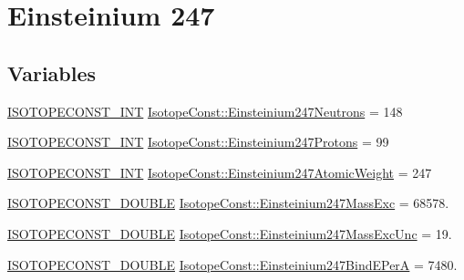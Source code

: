 \hypertarget{group___isotope_const-_einsteinium-_es247}{}\section{Einsteinium 247}
\label{group___isotope_const-_einsteinium-_es247}
\subsection*{Variables}
\begin{DoxyCompactItemize}
\item 
\mbox{\hyperlink{group___isotope_const-_macros_ga5f18360b3e99483a35c32d789e62621c}{I\+S\+O\+T\+O\+P\+E\+C\+O\+N\+S\+T\+\_\+\+I\+NT}} \mbox{\hyperlink{group___isotope_const-_einsteinium-_es247_gae4c076cff4a05f58e2dd157de63b1347}{Isotope\+Const\+::\+Einsteinium247\+Neutrons}} = 148
\item 
\mbox{\hyperlink{group___isotope_const-_macros_ga5f18360b3e99483a35c32d789e62621c}{I\+S\+O\+T\+O\+P\+E\+C\+O\+N\+S\+T\+\_\+\+I\+NT}} \mbox{\hyperlink{group___isotope_const-_einsteinium-_es247_ga9a24452b7f0504983211a9c3bdc79c00}{Isotope\+Const\+::\+Einsteinium247\+Protons}} = 99
\item 
\mbox{\hyperlink{group___isotope_const-_macros_ga5f18360b3e99483a35c32d789e62621c}{I\+S\+O\+T\+O\+P\+E\+C\+O\+N\+S\+T\+\_\+\+I\+NT}} \mbox{\hyperlink{group___isotope_const-_einsteinium-_es247_gac638379bc26970ea3e6f8f4d88b9a42d}{Isotope\+Const\+::\+Einsteinium247\+Atomic\+Weight}} = 247
\item 
\mbox{\hyperlink{group___isotope_const-_macros_ga8f45a7272ce02c0b4c65c44636ed719a}{I\+S\+O\+T\+O\+P\+E\+C\+O\+N\+S\+T\+\_\+\+D\+O\+U\+B\+LE}} \mbox{\hyperlink{group___isotope_const-_einsteinium-_es247_gad3102ff97cd2665095771b7418e05108}{Isotope\+Const\+::\+Einsteinium247\+Mass\+Exc}} = 68578.
\item 
\mbox{\hyperlink{group___isotope_const-_macros_ga8f45a7272ce02c0b4c65c44636ed719a}{I\+S\+O\+T\+O\+P\+E\+C\+O\+N\+S\+T\+\_\+\+D\+O\+U\+B\+LE}} \mbox{\hyperlink{group___isotope_const-_einsteinium-_es247_gabff537676c327bf087c19140b1f58189}{Isotope\+Const\+::\+Einsteinium247\+Mass\+Exc\+Unc}} = 19.
\item 
\mbox{\hyperlink{group___isotope_const-_macros_ga8f45a7272ce02c0b4c65c44636ed719a}{I\+S\+O\+T\+O\+P\+E\+C\+O\+N\+S\+T\+\_\+\+D\+O\+U\+B\+LE}} \mbox{\hyperlink{group___isotope_const-_einsteinium-_es247_ga94f4585be5b7c7222989f6a58d7e3418}{Isotope\+Const\+::\+Einsteinium247\+Bind\+E\+PerA}} = 7480.

\end{DoxyCompactItemize}
